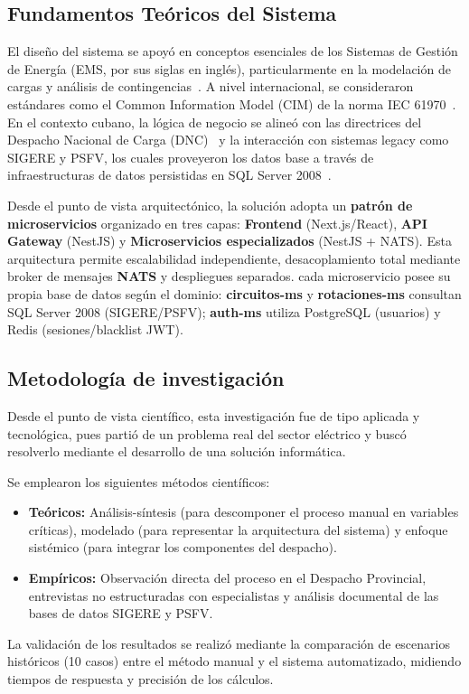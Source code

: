 \subsection{Fundamentos Teóricos del Sistema}
El diseño del sistema se apoyó en conceptos esenciales de los Sistemas de Gestión de Energía (EMS, por sus siglas en inglés), particularmente en la modelación de cargas y análisis de contingencias~\citep{gomez2016}. A nivel internacional, se consideraron estándares como el Common Information Model (CIM) de la norma IEC 61970~\citep{iec2020}. En el contexto cubano, la lógica de negocio se alineó con las directrices del Despacho Nacional de Carga (DNC)~\citep{union2023} y la interacción con sistemas legacy como SIGERE y PSFV, los cuales proveyeron los datos base a través de infraestructuras de datos persistidas en SQL Server 2008~\citep{villalba2021}.

Desde el punto de vista arquitectónico, la solución adopta un \textbf{patrón de microservicios} organizado en tres capas: \textbf{Frontend} (Next.js/React), \textbf{API Gateway} (NestJS) y \textbf{Microservicios especializados} (NestJS + NATS). Esta arquitectura permite escalabilidad independiente, desacoplamiento total mediante broker de mensajes \textbf{NATS} y despliegues separados. cada microservicio posee su propia base de datos según el dominio: \textbf{circuitos-ms} y \textbf{rotaciones-ms} consultan SQL Server 2008 (SIGERE/PSFV); \textbf{auth-ms} utiliza PostgreSQL (usuarios) y Redis (sesiones/blacklist JWT).

\subsection{Metodología de investigación}
Desde el punto de vista científico, esta investigación fue de tipo aplicada y tecnológica, pues partió de un problema real del sector eléctrico y buscó resolverlo mediante el desarrollo de una solución informática.

Se emplearon los siguientes métodos científicos:
\begin{itemize}
    \item \textbf{Teóricos:} Análisis-síntesis (para descomponer el proceso manual en variables críticas), modelado (para representar la arquitectura del sistema) y enfoque sistémico (para integrar los componentes del despacho).
    \item \textbf{Empíricos:} Observación directa del proceso en el Despacho Provincial, entrevistas no estructuradas con especialistas y análisis documental de las bases de datos SIGERE y PSFV.
\end{itemize}
La validación de los resultados se realizó mediante la comparación de escenarios históricos (10 casos) entre el método manual y el sistema automatizado, midiendo tiempos de respuesta y precisión de los cálculos.

